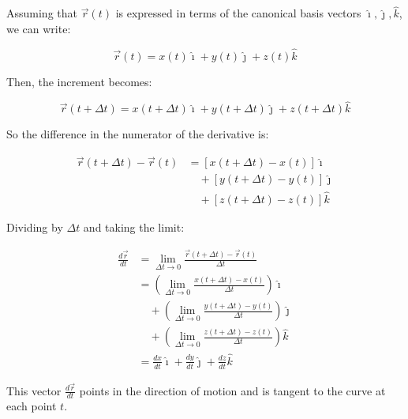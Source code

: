Assuming that \(\vec{r}(t)\) is expressed in terms of the canonical basis vectors \(\hat{\imath}, \hat{\jmath}, \hat{k}\), 
we can write:

\[
\vec{r}(t) = x(t)\hat{\imath} + y(t)\hat{\jmath} + z(t)\hat{k}
\]

Then, the increment becomes:

\[
\vec{r}(t + \Delta t) = x(t + \Delta t)\hat{\imath} + y(t + \Delta t)\hat{\jmath} + z(t + \Delta t)\hat{k}
\]

So the difference in the numerator of the derivative is:

\begin{align*}
\vec{r}(t + \Delta t) - \vec{r}(t) &= \left[x(t + \Delta t) - x(t)\right]\hat{\imath} \\
&\quad + \left[y(t + \Delta t) - y(t)\right]\hat{\jmath} \\
&\quad + \left[z(t + \Delta t) - z(t)\right]\hat{k}
\end{align*}

Dividing by \(\Delta t\) and taking the limit:

\begin{align*}
\frac{d\vec{r}}{dt} &= \lim_{\Delta t \to 0} \frac{\vec{r}(t + \Delta t) - \vec{r}(t)}{\Delta t} \\
&= \left( \lim_{\Delta t \to 0} \frac{x(t + \Delta t) - x(t)}{\Delta t} \right) \hat{\imath} \\
&\quad + \left( \lim_{\Delta t \to 0} \frac{y(t + \Delta t) - y(t)}{\Delta t} \right) \hat{\jmath} \\
&\quad + \left( \lim_{\Delta t \to 0} \frac{z(t + \Delta t) - z(t)}{\Delta t} \right) \hat{k} \\
&= \frac{dx}{dt} \hat{\imath} + \frac{dy}{dt} \hat{\jmath} + \frac{dz}{dt} \hat{k}
\end{align*}

This vector \(\frac{d\vec{r}}{dt}\) points in the direction of motion and is tangent to the curve at each point \(t\).

